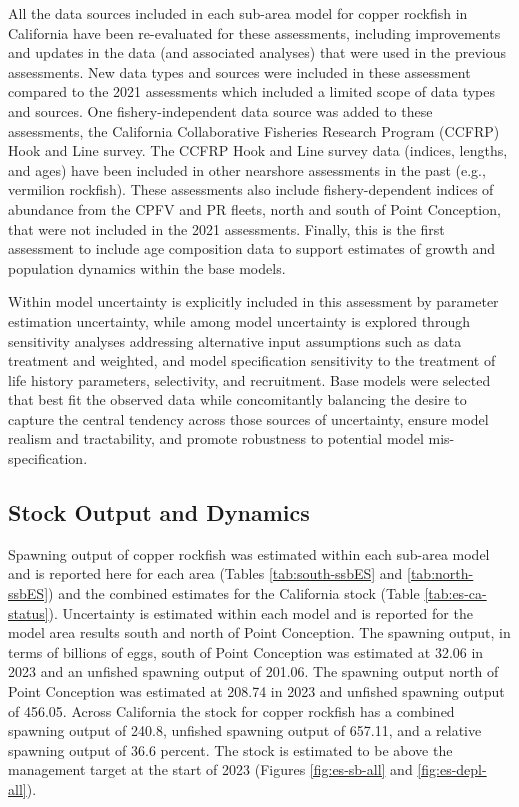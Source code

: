 \documentclass[11pt,
  letterpaper,
]{article}
\begin{document}
All the data sources included in each sub-area model for copper rockfish in California have been re-evaluated for these assessments, including improvements and updates in the data (and associated analyses) that were used in the previous assessments. New data types and sources were included in these assessment compared to the 2021 assessments which included a limited scope of data types and sources. One fishery-independent data source was added to these assessments, the California Collaborative Fisheries Research Program (CCFRP) Hook and Line survey. The CCFRP Hook and Line survey data (indices, lengths, and ages) have been included in other nearshore assessments in the past (e.g., vermilion rockfish). These assessments also include fishery-dependent indices of abundance from the CPFV and PR fleets, north and south of Point Conception, that were not included in the 2021 assessments. Finally, this is the first assessment to include age composition data to support estimates of growth and population dynamics within the base models.

Within model uncertainty is explicitly included in this assessment by parameter estimation uncertainty, while among model uncertainty is explored through sensitivity analyses addressing alternative input assumptions such as data treatment and weighted, and model specification sensitivity to the treatment of life history parameters, selectivity, and recruitment. Base models were selected that best fit the observed data while concomitantly balancing the desire to capture the central tendency across those sources of uncertainty, ensure model realism and tractability, and promote robustness to potential model mis-specification.

\subsection*{Stock Output and Dynamics}\label{stock-output-and-dynamics}

Spawning output of copper rockfish was estimated within each sub-area model and is reported here for each area (Tables \ref{tab:south-ssbES} and \ref{tab:north-ssbES}) and the combined estimates for the California stock (Table \ref{tab:es-ca-status}). Uncertainty is estimated within each model and is reported for the model area results south and north of Point Conception. The spawning output, in terms of billions of eggs, south of Point Conception was estimated at 32.06 in 2023 and an unfished spawning output of 201.06. The spawning output north of Point Conception was estimated at 208.74 in 2023 and unfished spawning output of 456.05. Across California the stock for copper rockfish has a combined spawning output of 240.8, unfished spawning output of 657.11, and a relative spawning output of 36.6 percent. The stock is estimated to be above the management target at the start of 2023 (Figures \ref{fig:es-sb-all} and \ref{fig:es-depl-all}).
\end{document}
